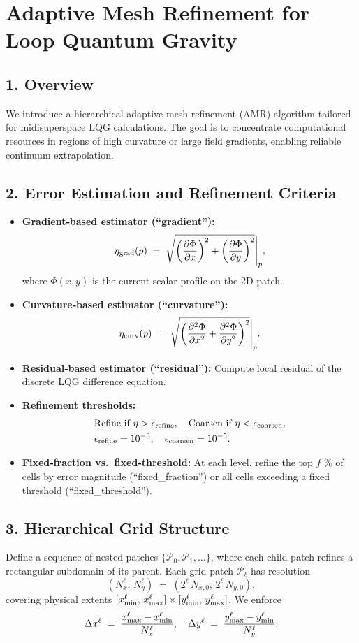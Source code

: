 \documentclass[12pt]{article}
\begin{document}
\section*{Adaptive Mesh Refinement for Loop Quantum Gravity}

\subsection*{1. Overview}
We introduce a hierarchical adaptive mesh refinement (AMR) algorithm tailored for midisuperspace LQG calculations. The goal is to concentrate computational resources in regions of high curvature or large field gradients, enabling reliable continuum extrapolation.

\subsection*{2. Error Estimation and Refinement Criteria}
\begin{itemize}
  \item \textbf{Gradient‐based estimator (``gradient''):} 
    \[
      \eta_{\rm grad}(p) \;=\;\sqrt{\left(\frac{\partial \Phi}{\partial x}\right)^2 + \left(\frac{\partial \Phi}{\partial y}\right)^2}\Bigg|_{p},
    \]
    where $\Phi(x,y)$ is the current scalar profile on the 2D patch.  
  \item \textbf{Curvature‐based estimator (``curvature''):} 
    \[
      \eta_{\rm curv}(p) \;=\;\sqrt{\left(\frac{\partial^2 \Phi}{\partial x^2} + \frac{\partial^2 \Phi}{\partial y^2}\right)^2}\Bigg|_{p}.
    \]
  \item \textbf{Residual‐based estimator (``residual''):} Compute local residual of the discrete LQG difference equation.  
  \item \textbf{Refinement thresholds:}  
    \begin{align*}
      &\text{Refine if } \eta > \epsilon_{\rm refine},\quad 
      \text{Coarsen if } \eta < \epsilon_{\rm coarsen}, \\
      &\epsilon_{\rm refine} = 10^{-3}, \quad \epsilon_{\rm coarsen} = 10^{-5}.
    \end{align*}
  \item \textbf{Fixed‐fraction vs.\ fixed‐threshold:} At each level, refine the top $f$ \% of cells by error magnitude (``fixed_fraction'') or all cells exceeding a fixed threshold (``fixed_threshold'').
\end{itemize}

\subsection*{3. Hierarchical Grid Structure}
Define a sequence of nested patches $\{\mathcal{P}_0,\mathcal{P}_1,\ldots\}$, where each child patch refines a rectangular subdomain of its parent.  Each grid patch $\mathcal{P}_\ell$ has resolution 
\[
  (N_x^\ell,\,N_y^\ell)\;=\;(2^\ell\,N_{x,0},\,2^\ell\,N_{y,0}),
\]
covering physical extents $[x_{\rm min}^\ell,\,x_{\rm max}^\ell]\times[y_{\rm min}^\ell,\,y_{\rm max}^\ell]$.  We enforce
\[
  \Delta x^\ell \;=\; \frac{x_{\rm max}^\ell - x_{\rm min}^\ell}{N_x^\ell}, 
  \quad \Delta y^\ell \;=\; \frac{y_{\rm max}^\ell - y_{\rm min}^\ell}{N_y^\ell}.
\]
\end{document}

